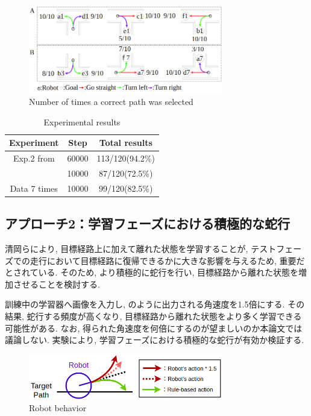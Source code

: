 \documentclass{jarticle}
\begin{document}
\begin{figure}[h]
  \centering
   \includegraphics[width=85mm]{10000step_act1.0.png}
   \vspace*{-4mm}
   \caption{Number of times a correct path was selected}
   \label{fig: fig11}
 \end{figure}

 \vspace{-8mm}

 \begin{table}[H]
  \caption{Experimental results}
  \label{tbl: table4}
  \centering
  \footnotesize
  \vspace{2mm}
  \begin{tabular}{|c|c|c|}
   \hline
   Experiment & Step & Total results \\\hline
   Exp.2 from \cite{mech} & 60000 & 113/120(94.2\%) \\ \cline{2-3}
  & 10000 & 87/120(72.5\%)\\\hline
  Data 7 times & 10000 & 99/120(82.5\%)\\
   \hline
  \end{tabular}
 \end{table}

\subsection{アプローチ2：学習フェーズにおける積極的な蛇行}
清岡ら\cite{kiyooka}により, 目標経路上に加えて離れた状態を学習することが, テストフェーズでの走行において目標経路に復帰できるかに大きな影響を与えるため, 重要だとされている. そのため, より積極的に蛇行を行い, 目標経路から離れた状態を増加させることを検討する.
\par
訓練中の学習器へ画像を入力し, のように出力される角速度を1.5倍にする. その結果, 蛇行する頻度が高くなり, 目標経路から離れた状態をより多く学習できる可能性がある. なお, 得られた角速度を何倍にするのが望ましいのか本論文では議論しない. 実験により, 学習フェーズにおける積極的な蛇行が有効か検証する.

\begin{figure}[h]
  \centering
   \includegraphics[width=85mm]{3action3.png}
   \vspace*{-4mm}
   \caption{Robot behavior}
   \label{fig: fig12}
 \end{figure}
\end{document}
